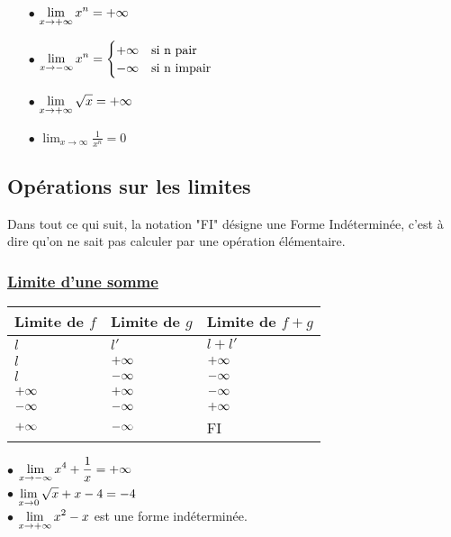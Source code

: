 \begin{itemize}
 \item[$  \bullet$] $ \displaystyle\lim_{x \to +\infty}x^{n}= +\infty$ 
  \item[$  \bullet$] $\displaystyle \lim_{x \to -\infty}x^{n}= \begin{cases}
+\infty & \text{si n pair} \\
-\infty & \text{si  n impair}
\end{cases}$ 
  \item[$  \bullet$] $ \displaystyle\lim_{x \to +\infty}\sqrt{x}=+\infty$ 
  \item[$  \bullet$]$\displaystyle \lim_{x \to \infty} \frac{1}{x^{n}}=0$ 
 \end{itemize}





\subsection{  Opérations sur les limites}
 Dans tout ce qui suit, la notation "FI" désigne une Forme Indéterminée, c'est à dire qu'on ne sait pas calculer par une opération élémentaire.

\subsubsection*{ \underline{Limite d'une somme}}

\begin{tabularx}{\textwidth}{|X|X|X|}
\hline
Limite de $ f $ & Limite de $ g $ &Limite de $ f+g $ \\
\hline
$ l $& $ l' $&$ l+l' $ \\
\hline
 $ l $& $ +\infty $& $ +\infty $\\
\hline
$ l $ & $ -\infty $& $ -\infty $\\
\hline
$ +\infty $& $ +\infty $& $ -\infty $\\
\hline
$ -\infty $& $ -\infty $&$ +\infty $ \\
\hline
$ +\infty $& $ -\infty $& FI\\
\hline

\end{tabularx}

\begin{example}

$ \bullet $  \; $ \displaystyle \lim_{x\to -\infty}x^{4}+\frac{1}{x} =+\infty$\\
$\bullet $  \; $ \displaystyle \lim_{x\to 0}\sqrt{x}+x-4 =-4$\\
$ \bullet $  \; $ \displaystyle \lim_{x\to +\infty}x^{2}-x $ \;est une forme indéterminée.

\end{example}



